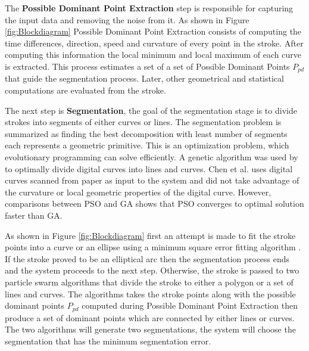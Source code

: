 
The \textbf{Possible Dominant Point Extraction} step is responsible for capturing the input data and removing the noise from it. As shown in Figure \ref{fig:Blockdiagram} Possible Dominant Point Extraction consists of computing the time differences, direction, speed and curvature of every point in the stroke. After computing this information the local minimum and local maximum of each curve is extracted. This process estimates a set of a set of Possible Dominant Points $P_{pd}$ that guide the segmentation process. Later, other geometrical and statistical computations are evaluated from the stroke. %
 
  
The next step is \textbf{Segmentation}, the goal of the segmentation stage is to divide strokes into segments of either curves or lines. The segmentation problem is summarized as finding the best decomposition with least number of segments each represents a geometric primitive. This is an optimization problem, which evolutionary programming can solve efficiently. A genetic algorithm was used by \cite{CruveDivisionSwarm} to optimally divide digital curves into lines and curves. Chen et al.\cite{CruveDivisionSwarm} uses digital curves scanned from paper as input to the system and did not take advantage of the curvature or local geometric properties of the digital curve. However, comparisons between PSO and GA \cite{ComparePSOGA05} shows that PSO converges to optimal solution faster than GA.  

 As shown in Figure \ref{fig:Blockdiagram} first an attempt is made to fit the stroke points into a curve or an ellipse using a minimum square error fitting algorithm \cite{chernov}. If the stroke proved to be an elliptical arc then the segmentation process ends and the system proceeds to the next step. Otherwise, the stroke is passed to two particle swarm algorithms that divide the stroke to either a polygon or a set of lines and curves. The algorithms takes the stroke points along with the possible dominant points $P_{pd}$ computed during Possible Dominant Point Extraction then produce a set of dominant points which are connected by either lines or curves. The two algorithms will generate two segmentations, the system will choose the segmentation that has the minimum segmentation error.%

